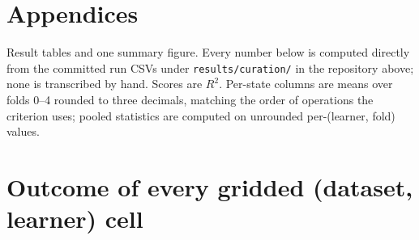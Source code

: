 \documentclass[10pt,letterpaper]{article}
\begin{document}
\appendix
\newpage

\setcounter{figure}{0}
\setcounter{table}{0}

\section*{Appendices}

\noindent Result tables and one summary figure. Every number below is computed directly from
the committed run CSVs under \texttt{results/curation/} in the repository above; none is
transcribed by hand. Scores are $R^2$. Per-state columns are means over folds 0--4 rounded to
three decimals, matching the order of operations the criterion uses; pooled statistics are
computed on unrounded per-(learner, fold) values.

\section{Outcome of every gridded (dataset, learner) cell}
\end{document}
